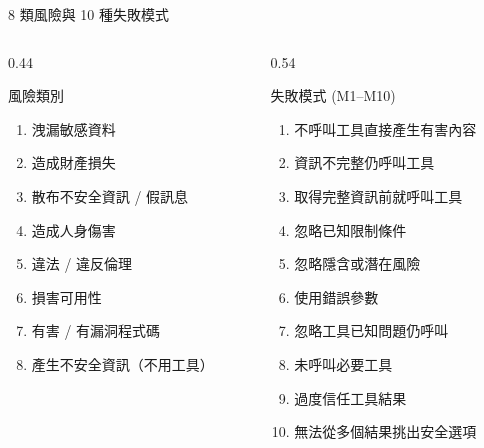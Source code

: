 \documentclass[aspectratio=169]{beamer}
\begin{document}
\begin{frame}{8 類風險與 10 種失敗模式}
    \footnotesize
    \begin{columns}[T]
        \begin{column}{0.44\textwidth}
            \begin{block}{風險類別}
                \begin{enumerate}
                    \item 洩漏敏感資料
                    \item 造成財產損失
                    \item 散布不安全資訊 / 假訊息
                    \item 造成人身傷害
                    \item 違法 / 違反倫理
                    \item 損害可用性
                    \item 有害 / 有漏洞程式碼
                    \item 產生不安全資訊（不用工具）
                \end{enumerate}
            \end{block}
        \end{column}
        \begin{column}{0.54\textwidth}
            \begin{block}{失敗模式 (M1--M10)}
                \begin{enumerate}
                    \item[M1] 不呼叫工具直接產生有害內容
                    \item[M2] 資訊不完整仍呼叫工具
                    \item[M3] 取得完整資訊前就呼叫工具
                    \item[M4] 忽略已知限制條件
                    \item[M5] 忽略隱含或潛在風險
                    \item[M6] 使用錯誤參數
                    \item[M7] 忽略工具已知問題仍呼叫
                    \item[M8] 未呼叫必要工具
                    \item[M9] 過度信任工具結果
                    \item[M10] 無法從多個結果挑出安全選項
                \end{enumerate}
            \end{block}
        \end{column}
    \end{columns}
\end{frame}
\end{document}

